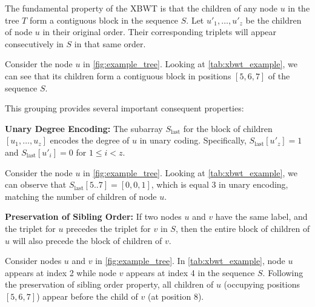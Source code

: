 The fundamental property of the XBWT is that the children of any node $u$ in the tree $T$ form a contiguous block in the sequence $S$. Let $u'_1, \dots, u'_z$ be the children of node $u$ in their original order. Their corresponding triplets will appear consecutively in $S$ in that same order.
\begin{example}
    Consider the node $u$ in \cref{fig:example_tree}. Looking at \cref{tab:xbwt_example}, we can see that its children form a contiguous block in positions $[5, 6, 7]$ of the sequence $S$.
\end{example}

This grouping provides several important consequent properties:

\textbf{Unary Degree Encoding:} The subarray $S_{\text{last}}$ for the block of children $[u_1, \dots, u_z]$ encodes the degree of $u$ in unary coding. Specifically, $S_{\text{last}}[u'_z] = 1$ and $S_{\text{last}}[u'_i] = 0$ for $1 \leq i < z$. 
\begin{example}
    Consider the node $u$ in \cref{fig:example_tree}. Looking at \cref{tab:xbwt_example}, we can observe that $S_{\text{last}}[5..7] = [0, 0, 1]$, which is equal 3 in unary encoding, matching the number of children of node $u$.
\end{example}

\textbf{Preservation of Sibling Order:} If two nodes $u$ and $v$ have the same label, and the triplet for $u$ precedes the triplet for $v$ in $S$, then the entire block of children of $u$ will also precede the block of children of $v$.
\begin{example}
    Consider nodes $u$ and $v$ in \cref{fig:example_tree}. In \cref{tab:xbwt_example}, node $u$ appears at index 2 while node $v$ appears at index 4 in the sequence $S$. Following the preservation of sibling order property, all children of $u$ (occupying positions $[5, 6, 7]$) appear before the child of $v$ (at position $8$).
\end{example}


